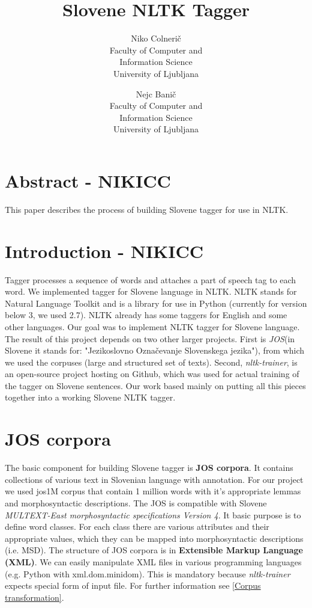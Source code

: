 \documentclass[11pt,a4paper,english,twocolumn]{article}
\title{\textbf{Slovene NLTK Tagger}}
\author{
Niko Colnerič \\
\footnotesize Faculty of Computer and \\
\footnotesize Information Science \\
\footnotesize University of Ljubljana \\
\and
Nejc Banič \\
\footnotesize Faculty of Computer and \\
\footnotesize Information Science \\
\footnotesize University of Ljubljana \\
}
\begin{document}
\maketitle
\thispagestyle{empty}

\section*{Abstract - NIKICC}
This paper describes the process of building Slovene tagger for use in NLTK.  
\section{Introduction - NIKICC}
Tagger processes a sequence of words and attaches a part of speech tag to each word. We implemented tagger for Slovene language in NLTK. NLTK stands for Natural Language Toolkit and is a library for use in Python (currently for version below 3, we used 2.7). NLTK already has some taggers for English and some other languages. Our goal was to implement NLTK tagger for Slovene language. The result of this project depends on two other larger projects. First is \textit{JOS}\cite{JOS}(in Slovene it stands for: "Jezikoslovno Označevanje Slovenskega jezika"), from which we used the corpuses (large and structured set of texts). Second, \textit{nltk-trainer}\cite{nltk-trainer}, is an open-source project hosting on Github, which was used for actual training of the tagger on Slovene sentences. Our work based mainly on putting all this pieces together into a working Slovene NLTK tagger.
\section{JOS corpora}
The basic component for building Slovene tagger is \textbf{JOS corpora}. It contains collections of various text in Slovenian language with annotation. For our project we used jos1M corpus that contain 1 million words with it's appropriate lemmas and morphosyntactic descriptions. The JOS is compatible with Slovene\textit{ MULTEXT-East morphosyntactic specifications Version 4}\cite{MULTEXT-East}. It basic purpose is to define word classes. For each class there are various attributes and their appropriate values, which they can be mapped into morphosyntactic descriptions (i.e. MSD). The structure of JOS corpora is in  \textbf{Extensible Markup Language (XML)}. We can easily manipulate XML files in various programming languages (e.g. Python with xml.dom.minidom). This is mandatory because \textit{nltk-trainer}\cite{nltk-trainer} expects special form of input file. For further information see \ref{Corpus transformation}.
\end{document}
